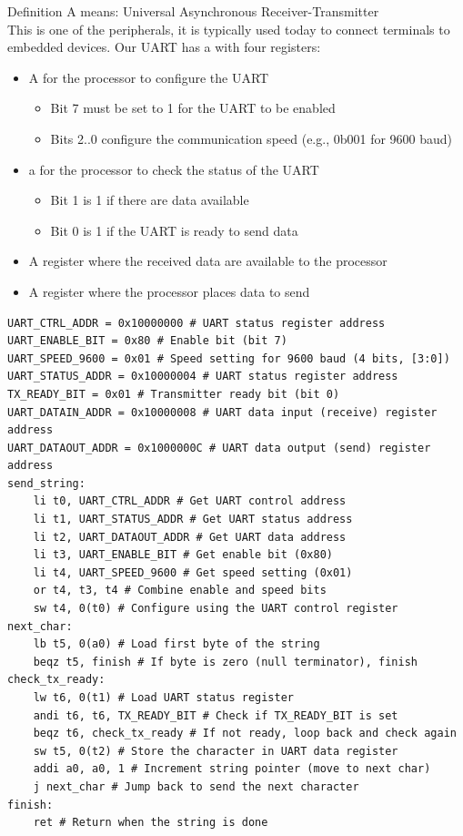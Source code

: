 \begin{parag}{Definition}
    A  means: Universal Asynchronous Receiver-Transmitter\\
	This is one of the  peripherals, it is typically used today to connect terminals to embedded devices. Our UART has a  with four registers:
	\begin{itemize}
	    \item A  for the processor to configure the UART 
			\begin{itemize}
				\item Bit 7 must be set to 1 for the UART to be enabled
				\item Bits 2..0 configure the communication speed (e.g., 0b001 for 9600 baud)
			\end{itemize}
		\item a  for the processor to check the status of the UART
			\begin{itemize}
				\item Bit 1 is 1 if there are data available
				\item Bit 0 is 1 if the UART is ready to send data
			\end{itemize}
			\item A  register where the received  data are available to the processor
			\item A  register where the processor places data to send
	\end{itemize}

\end{parag}

\begin{lstlisting}[language={[RISC-V]Assembler}]
UART_CTRL_ADDR = 0x10000000 # UART status register address
UART_ENABLE_BIT = 0x80 # Enable bit (bit 7)
UART_SPEED_9600 = 0x01 # Speed setting for 9600 baud (4 bits, [3:0])
UART_STATUS_ADDR = 0x10000004 # UART status register address
TX_READY_BIT = 0x01 # Transmitter ready bit (bit 0)
UART_DATAIN_ADDR = 0x10000008 # UART data input (receive) register address
UART_DATAOUT_ADDR = 0x1000000C # UART data output (send) register address
send_string:
	li t0, UART_CTRL_ADDR # Get UART control address
	li t1, UART_STATUS_ADDR # Get UART status address
	li t2, UART_DATAOUT_ADDR # Get UART data address
	li t3, UART_ENABLE_BIT # Get enable bit (0x80)
	li t4, UART_SPEED_9600 # Get speed setting (0x01)
	or t4, t3, t4 # Combine enable and speed bits
	sw t4, 0(t0) # Configure using the UART control register
next_char:
	lb t5, 0(a0) # Load first byte of the string
	beqz t5, finish # If byte is zero (null terminator), finish
check_tx_ready:
	lw t6, 0(t1) # Load UART status register
	andi t6, t6, TX_READY_BIT # Check if TX_READY_BIT is set
	beqz t6, check_tx_ready # If not ready, loop back and check again
	sw t5, 0(t2) # Store the character in UART data register
	addi a0, a0, 1 # Increment string pointer (move to next char)
	j next_char # Jump back to send the next character
finish:
	ret # Return when the string is done
\end{lstlisting}
	
